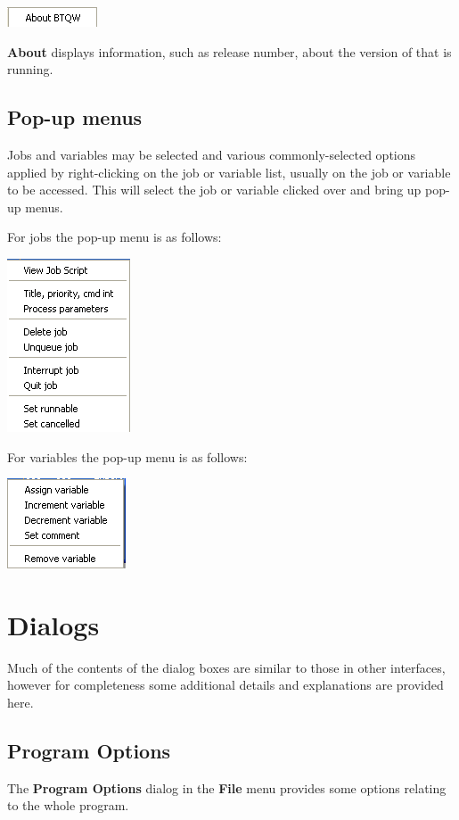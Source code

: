\includegraphics{img/btqwhelpmenu.png} 

\textbf{About} displays information, such as release number, about the
version of  that is running.

\subsection{Pop-up menus}
Jobs and variables may be selected and various commonly-selected options
applied by right-clicking on the job or variable list, usually on the job or variable to be accessed. This will select
the job or variable clicked over and bring up pop-up menus.

For jobs the pop-up menu is as follows:

\includegraphics{img/btqwjobpop.png}

For variables the pop-up menu is as follows:

\includegraphics{img/btqwvarpop.png}

\section{Dialogs}
Much of the contents of the  dialog boxes are similar to those in other \ProductName{} interfaces,
however for completeness some additional details and explanations are provided here.

\subsection{Program Options}
The \textbf{Program Options} dialog in the \textbf{File} menu provides some options relating to the whole program.

